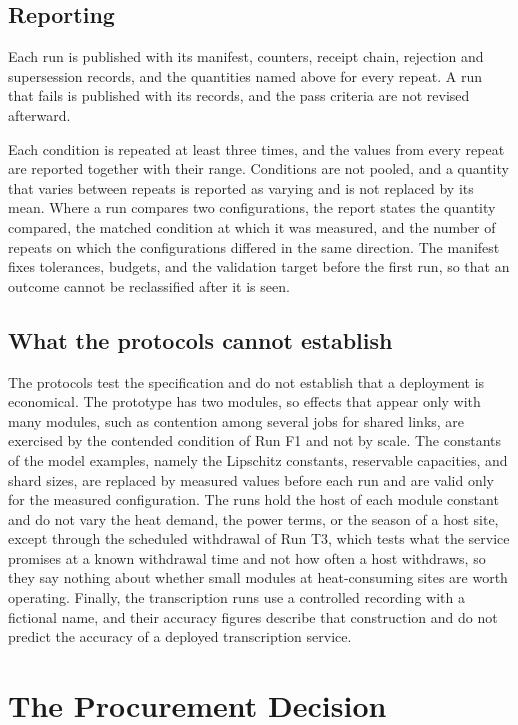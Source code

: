 \documentclass[11pt,openany]{book}
\theoremstyle{remark}
\begin{document}
\section{Reporting}

Each run is published with its manifest, counters, receipt chain, rejection and supersession records, and the quantities named above for every repeat. A run that fails is published with its records, and the pass criteria are not revised afterward.

Each condition is repeated at least three times, and the values from every repeat are reported together with their range. Conditions are not pooled, and a quantity that varies between repeats is reported as varying and is not replaced by its mean. Where a run compares two configurations, the report states the quantity compared, the matched condition at which it was measured, and the number of repeats on which the configurations differed in the same direction. The manifest fixes tolerances, budgets, and the validation target before the first run, so that an outcome cannot be reclassified after it is seen.

\section{What the protocols cannot establish}

The protocols test the specification and do not establish that a deployment is economical. The prototype has two modules, so effects that appear only with many modules, such as contention among several jobs for shared links, are exercised by the contended condition of Run F1 and not by scale. The constants of the model examples, namely the Lipschitz constants, reservable capacities, and shard sizes, are replaced by measured values before each run and are valid only for the measured configuration. The runs hold the host of each module constant and do not vary the heat demand, the power terms, or the season of a host site, except through the scheduled withdrawal of Run T3, which tests what the service promises at a known withdrawal time and not how often a host withdraws, so they say nothing about whether small modules at heat-consuming sites are worth operating. Finally, the transcription runs use a controlled recording with a fictional name, and their accuracy figures describe that construction and do not predict the accuracy of a deployed transcription service.

\chapter{The Procurement Decision}
\end{document}
